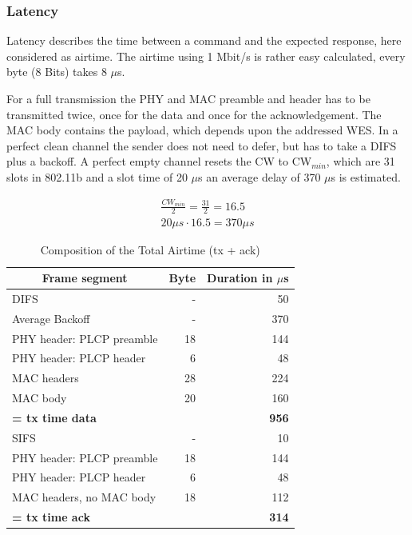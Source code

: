 \subsubsection*{Latency}

Latency describes the time between a command and the expected response, here considered as airtime.
The airtime using 1 Mbit/s is rather easy calculated, every byte (8 Bits) takes 8 $\mu$s.

For a full transmission the PHY and MAC preamble and header has to be transmitted twice, 
once for the data and once for the acknowledgement.
The MAC body contains the payload, which depends upon the addressed \ac{WES}.
In a perfect clean channel the sender does not need to defer, but has to take a \ac{DIFS} plus a backoff.
A perfect empty channel resets the CW to CW$_{min}$, which are 31 slots in 802.11b
and a slot time of 20 $\mu$s an average delay of 370 $\mu$s is estimated.

\begin{align}
	\frac{CW_{min}}{2}=\frac{31}{2}=16.5 \\
	20\mu s \cdot 16.5 = 370\mu s
\end{align}

\begin{table}[h]
	\centering
	\begin{tabular} { lrr }
		\toprule
		\multicolumn{1}{c}{Frame segment}
		& \multicolumn{1}{c}{Byte}
		& \multicolumn{1}{c}{Duration in $\mu$s} \\
		\midrule
		DIFS								& -		& 50 \\
		Average Backoff						& -		& 370 \\
		PHY header: PLCP preamble			& 18	& 144 \\
		PHY header: PLCP header				& 6 	& 48 \\
		MAC headers							& 28	& 224 \\
		MAC body							& 20 	& 160 \\
		\textbf{= tx time data}				& 		& \textbf{956} \\
		SIFS								& -		& 10 \\
		PHY header: PLCP preamble			& 18	& 144 \\
		PHY header: PLCP header				& 6		& 48 \\
		MAC headers, no MAC body	 		& 18	& 112 \\
		\textbf{= tx time ack}				& 		& \textbf{314} \\
		\bottomrule
	\end{tabular}
	\caption{Composition of the Total Airtime (tx + ack)}
	\label{tab:airtime_unicast_calc}
\end{table}

